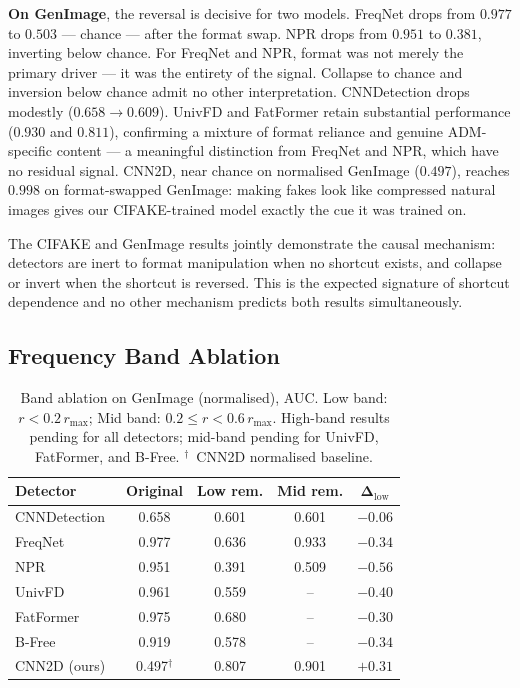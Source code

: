 \documentclass{bmvc2k}
\begin{document}
\noindent\textbf{On GenImage}, the reversal is decisive for two models. FreqNet drops from $0.977$ to $0.503$ --- chance --- after the format swap. NPR drops from $0.951$ to $0.381$, inverting below chance. For FreqNet and NPR, format was not merely the primary driver --- it was the entirety of the signal. Collapse to chance and inversion below chance admit no other interpretation. CNNDetection drops modestly ($0.658\to0.609$). UnivFD and FatFormer retain substantial performance ($0.930$ and $0.811$), confirming a mixture of format reliance and genuine ADM-specific content --- a meaningful distinction from FreqNet and NPR, which have no residual signal. CNN2D, near chance on normalised GenImage ($0.497$), reaches $0.998$ on format-swapped GenImage: making fakes look like compressed natural images gives our CIFAKE-trained model exactly the cue it was trained on.

The CIFAKE and GenImage results jointly demonstrate the causal mechanism: detectors are inert to format manipulation when no shortcut exists, and collapse or invert when the shortcut is reversed. This is the expected signature of shortcut dependence and no other mechanism predicts both results simultaneously.

\subsection{Frequency Band Ablation}
\label{sec:ablation_results}

\begin{table}[t]
\centering
\small
\setlength{\tabcolsep}{5pt}
\begin{tabular}{lcccc}
\toprule
\textbf{Detector} & \textbf{Original} & \textbf{Low rem.} & \textbf{Mid rem.} & $\boldsymbol{\Delta}_\text{low}$ \\
\midrule
CNNDetection~\cite{wang2020cnn} & 0.658 & 0.601 & 0.601 & $-0.06$ \\
FreqNet~\cite{freqnet}          & 0.977 & 0.636 & 0.933 & $-0.34$ \\
NPR~\cite{npr}                  & 0.951 & 0.391 & 0.509 & $-0.56$ \\
UnivFD~\cite{univfd}            & 0.961 & 0.559 & --    & $-0.40$ \\
FatFormer~\cite{fatformer}      & 0.975 & 0.680 & --    & $-0.30$ \\
B-Free~\cite{bfree}             & 0.919 & 0.578 & --    & $-0.34$ \\
CNN2D (ours)                    & 0.497$^{\dagger}$ & 0.807 & 0.901 & $+0.31$ \\
\bottomrule
\end{tabular}
\caption{Band ablation on GenImage (normalised), AUC. Low band: $r < 0.2\,r_{\max}$; Mid band: $0.2\leq r < 0.6\,r_{\max}$. High-band results pending for all detectors; mid-band pending for UnivFD, FatFormer, and B-Free. $^{\dagger}$~CNN2D normalised baseline.}
\label{tab:ablation}
\end{table}
\end{document}
